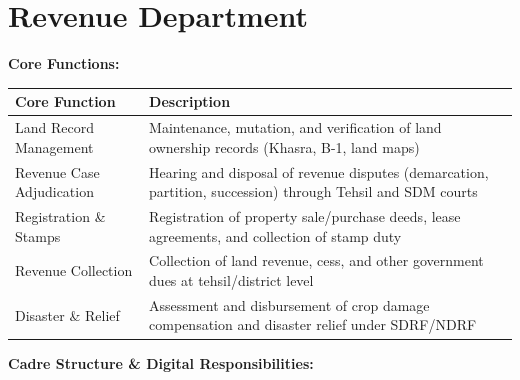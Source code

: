 \documentclass[11pt,a4paper]{article}
\begin{document}
\section{\textcolor{revcol}{Revenue Department}}

\textbf{Core Functions:}

\begin{table}[H]\centering\small
\begin{tabularx}{\textwidth}{L{3cm} X}
\toprule
\textbf{Core Function} & \textbf{Description} \\
\midrule
Land Record Management & Maintenance, mutation, and verification of land ownership records (Khasra, B-1, land maps) \\[3pt]
Revenue Case Adjudication & Hearing and disposal of revenue disputes (demarcation, partition, succession) through Tehsil and SDM courts \\[3pt]
Registration \& Stamps & Registration of property sale/purchase deeds, lease agreements, and collection of stamp duty \\[3pt]
Revenue Collection & Collection of land revenue, cess, and other government dues at tehsil/district level \\[3pt]
Disaster \& Relief & Assessment and disbursement of crop damage compensation and disaster relief under SDRF/NDRF \\
\bottomrule
\end{tabularx}
\end{table}


\textbf{Cadre Structure \& Digital Responsibilities:}
\end{document}
